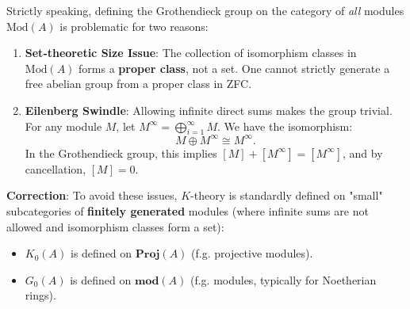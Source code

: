\begin{remark}
    Strictly speaking, defining the Grothendieck group on the category of \textit{all} modules $\mathrm{Mod}(A)$ is problematic for two reasons:

    \begin{enumerate}
        \item \textbf{Set-theoretic Size Issue}: The collection of isomorphism classes in $\mathrm{Mod}(A)$ forms a \textbf{proper class}, not a set. One cannot strictly generate a free abelian group from a proper class in ZFC.

        \item \textbf{Eilenberg Swindle}: Allowing infinite direct sums makes the group trivial. For any module $M$, let $M^\infty = \bigoplus_{i=1}^\infty M$. We have the isomorphism:
              \[
                  M \oplus M^\infty \cong M^\infty.
              \]
              In the Grothendieck group, this implies $[M] + [M^\infty] = [M^\infty]$, and by cancellation, $[M] = 0$.
    \end{enumerate}

    \textbf{Correction}: To avoid these issues, $K$-theory is standardly defined on "small" subcategories of \textbf{finitely generated} modules (where infinite sums are not allowed and isomorphism classes form a set):
    \begin{itemize}
        \item $K_0(A)$ is defined on $\mathbf{Proj}(A)$ (f.g. projective modules).
        \item $G_0(A)$ is defined on $\mathbf{mod}(A)$ (f.g. modules, typically for Noetherian rings).
    \end{itemize}
\end{remark}
